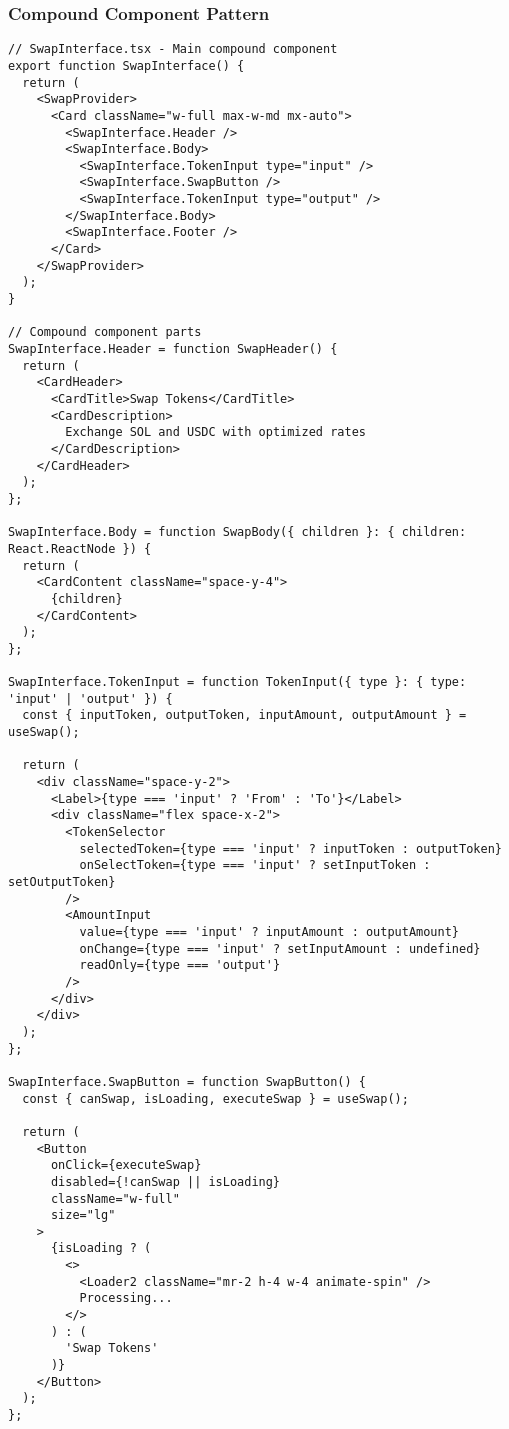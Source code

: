 \documentclass[11pt,a4paper]{article}
\begin{document}
\subsubsection{Compound Component Pattern}

\begin{lstlisting}[style=typescript, caption=SwapInterface Compound Component]
// SwapInterface.tsx - Main compound component
export function SwapInterface() {
  return (
    <SwapProvider>
      <Card className="w-full max-w-md mx-auto">
        <SwapInterface.Header />
        <SwapInterface.Body>
          <SwapInterface.TokenInput type="input" />
          <SwapInterface.SwapButton />
          <SwapInterface.TokenInput type="output" />
        </SwapInterface.Body>
        <SwapInterface.Footer />
      </Card>
    </SwapProvider>
  );
}

// Compound component parts
SwapInterface.Header = function SwapHeader() {
  return (
    <CardHeader>
      <CardTitle>Swap Tokens</CardTitle>
      <CardDescription>
        Exchange SOL and USDC with optimized rates
      </CardDescription>
    </CardHeader>
  );
};

SwapInterface.Body = function SwapBody({ children }: { children: React.ReactNode }) {
  return (
    <CardContent className="space-y-4">
      {children}
    </CardContent>
  );
};

SwapInterface.TokenInput = function TokenInput({ type }: { type: 'input' | 'output' }) {
  const { inputToken, outputToken, inputAmount, outputAmount } = useSwap();
  
  return (
    <div className="space-y-2">
      <Label>{type === 'input' ? 'From' : 'To'}</Label>
      <div className="flex space-x-2">
        <TokenSelector 
          selectedToken={type === 'input' ? inputToken : outputToken}
          onSelectToken={type === 'input' ? setInputToken : setOutputToken}
        />
        <AmountInput
          value={type === 'input' ? inputAmount : outputAmount}
          onChange={type === 'input' ? setInputAmount : undefined}
          readOnly={type === 'output'}
        />
      </div>
    </div>
  );
};

SwapInterface.SwapButton = function SwapButton() {
  const { canSwap, isLoading, executeSwap } = useSwap();
  
  return (
    <Button
      onClick={executeSwap}
      disabled={!canSwap || isLoading}
      className="w-full"
      size="lg"
    >
      {isLoading ? (
        <>
          <Loader2 className="mr-2 h-4 w-4 animate-spin" />
          Processing...
        </>
      ) : (
        'Swap Tokens'
      )}
    </Button>
  );
};


\end{lstlisting}
\end{document}
